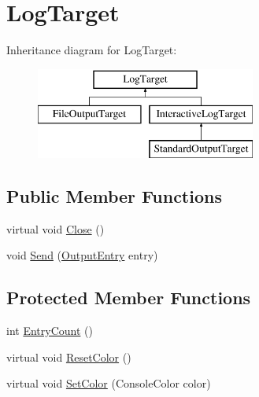 \hypertarget{classOTA_1_1Logging_1_1LogTarget}{}\section{Log\+Target}
\label{classOTA_1_1Logging_1_1LogTarget}
Inheritance diagram for Log\+Target\+:\begin{figure}[H]
\begin{center}
\leavevmode
\includegraphics[height=3.000000cm]{classOTA_1_1Logging_1_1LogTarget}
\end{center}
\end{figure}
\subsection*{Public Member Functions}
\begin{DoxyCompactItemize}
\item 
virtual void \hyperlink{classOTA_1_1Logging_1_1LogTarget_ace36743954f0a3a2e5d8cba379d5313f}{Close} ()
\item 
void \hyperlink{classOTA_1_1Logging_1_1LogTarget_aaee4fb83e5eaa9e8423be5b7baca8602}{Send} (\hyperlink{structOTA_1_1Logging_1_1OutputEntry}{Output\+Entry} entry)
\end{DoxyCompactItemize}
\subsection*{Protected Member Functions}
\begin{DoxyCompactItemize}
\item 
int \hyperlink{classOTA_1_1Logging_1_1LogTarget_abcc191484b348f076e8d8d14832dec3a}{Entry\+Count} ()
\item 
virtual void \hyperlink{classOTA_1_1Logging_1_1LogTarget_a5eae342fcf81534aef90242d4f7684aa}{Reset\+Color} ()
\item 
virtual void \hyperlink{classOTA_1_1Logging_1_1LogTarget_af289a1a417633601353caf23a8a3fc1f}{Set\+Color} (Console\+Color color)
\end{DoxyCompactItemize}

